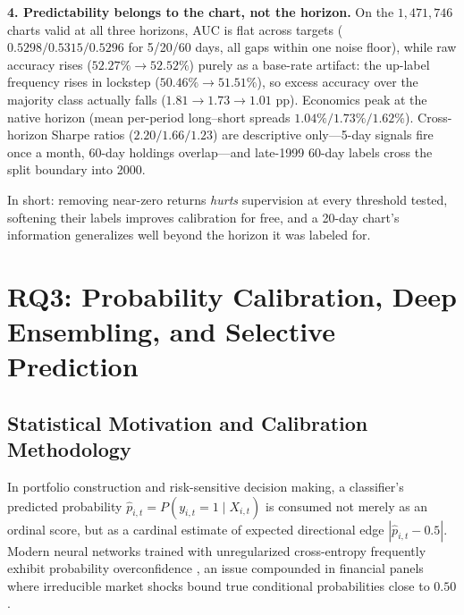 \documentclass[10pt]{article}
\begin{document}
\textbf{4. Predictability belongs to the chart, not the horizon.} On the $1{,}471{,}746$ charts valid at all three horizons, AUC is flat across targets ($0.5298 / 0.5315 / 0.5296$ for 5/20/60 days, all gaps within one noise floor), while raw accuracy rises ($52.27\% \to 52.52\%$) purely as a base-rate artifact: the up-label frequency rises in lockstep ($50.46\% \to 51.51\%$), so excess accuracy over the majority class actually falls ($1.81 \to 1.73 \to 1.01$ pp). Economics peak at the native horizon (mean per-period long--short spreads $1.04\% / 1.73\% / 1.62\%$). Cross-horizon Sharpe ratios ($2.20 / 1.66 / 1.23$) are descriptive only---5-day signals fire once a month, 60-day holdings overlap---and late-1999 60-day labels cross the split boundary into 2000.

In short: removing near-zero returns \emph{hurts} supervision at every threshold tested, softening their labels improves calibration for free, and a 20-day chart's information generalizes well beyond the horizon it was labeled for.

\section{RQ3: Probability Calibration, Deep Ensembling, and Selective Prediction}
\label{sec:sq3}

\subsection{Statistical Motivation and Calibration Methodology}
In portfolio construction and risk-sensitive decision making, a classifier's predicted probability $\hat{p}_{i,t} = P(y_{i,t}=1 \mid X_{i,t})$ is consumed not merely as an ordinal score, but as a cardinal estimate of expected directional edge $|\hat{p}_{i,t} - 0.5|$. Modern neural networks trained with unregularized cross-entropy frequently exhibit probability overconfidence \cite{guo2017calibration}, an issue compounded in financial panels where irreducible market shocks bound true conditional probabilities close to $0.50$.
\end{document}
